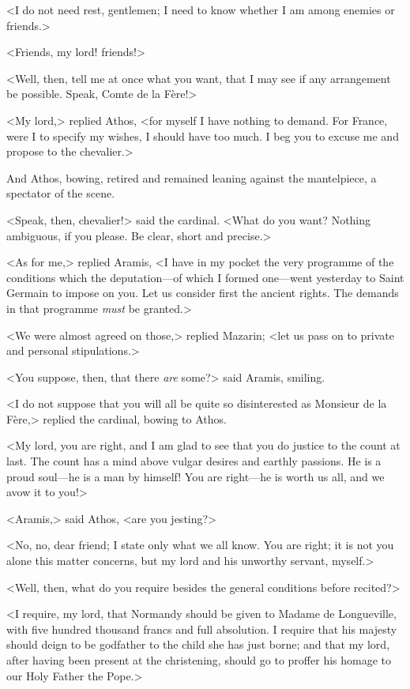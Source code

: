 <I do not need rest, gentlemen; I need to know whether I am among enemies or friends.>

<Friends, my lord! friends!>

<Well, then, tell me at once what you want, that I may see if any arrangement be possible. Speak, Comte de la Fère!>

<My lord,> replied Athos, <for myself I have nothing to demand. For France, were I to specify my wishes, I should have too much. I beg you to excuse me and propose to the chevalier.>

And Athos, bowing, retired and remained leaning against the mantelpiece, a spectator of the scene.

<Speak, then, chevalier!> said the cardinal. <What do you want? Nothing ambiguous, if you please. Be clear, short and precise.>

<As for me,> replied Aramis, <I have in my pocket the very programme of the conditions which the deputation—of which I formed one—went yesterday to Saint Germain to impose on you. Let us consider first the ancient rights. The demands in that programme \emph{must} be granted.>

<We were almost agreed on those,> replied Mazarin; <let us pass on to private and personal stipulations.>

<You suppose, then, that there \emph{are} some?> said Aramis, smiling.

<I do not suppose that you will all be quite so disinterested as Monsieur de la Fère,> replied the cardinal, bowing to Athos.

<My lord, you are right, and I am glad to see that you do justice to the count at last. The count has a mind above vulgar desires and earthly passions. He is a proud soul—he is a man by himself! You are right—he is worth us all, and we avow it to you!>

<Aramis,> said Athos, <are you jesting?>

<No, no, dear friend; I state only what we all know. You are right; it is not you alone this matter concerns, but my lord and his unworthy servant, myself.>

<Well, then, what do you require besides the general conditions before recited?>

<I require, my lord, that Normandy should be given to Madame de Longueville, with five hundred thousand francs and full absolution. I require that his majesty should deign to be godfather to the child she has just borne; and that my lord, after having been present at the christening, should go to proffer his homage to our Holy Father the Pope.>

